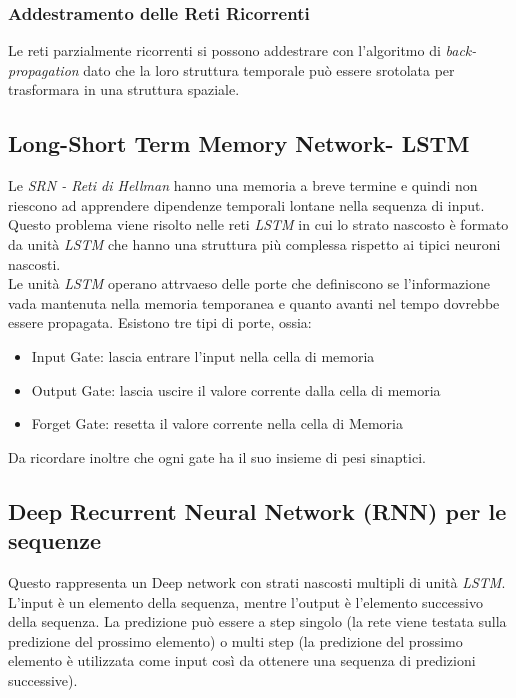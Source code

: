 \documentclass[12pt, a4paper]{article}
\begin{document}
\subsubsection{Addestramento delle Reti Ricorrenti}
Le reti parzialmente ricorrenti si possono addestrare con l'algoritmo di \textit{back-propagation} dato che la loro struttura temporale può essere srotolata per trasformara in una struttura spaziale.

\subsection{Long-Short Term Memory Network- LSTM}
Le \textit{SRN - Reti di Hellman} hanno una memoria a breve termine e quindi non riescono ad apprendere dipendenze temporali lontane nella sequenza di input. Questo problema viene risolto nelle reti \textit{LSTM} in cui lo strato nascosto è formato da unità \textit{LSTM} che hanno una struttura più complessa rispetto ai tipici neuroni nascosti.\\
Le unità \textit{LSTM} operano attrvaeso delle porte che definiscono se l'informazione vada mantenuta nella memoria temporanea e quanto avanti nel tempo dovrebbe essere propagata. Esistono tre tipi di porte, ossia:
\begin{itemize}
    \item Input Gate: lascia entrare l'input nella cella di memoria
    \item Output Gate: lascia uscire il valore corrente dalla cella di memoria
    \item Forget Gate: resetta il valore corrente nella cella di Memoria
\end{itemize}

Da ricordare inoltre che ogni gate ha il suo insieme di pesi sinaptici.

\subsection{Deep Recurrent Neural Network (RNN) per le sequenze}
Questo rappresenta un Deep network con strati nascosti multipli di unità \textit{LSTM}. L'input è un elemento della sequenza, mentre l'output è l'elemento successivo della sequenza. La predizione può essere a step singolo (la rete viene testata sulla predizione del prossimo elemento) o multi step (la predizione del prossimo elemento è utilizzata come input così da ottenere una sequenza di predizioni successive).
\end{document}

